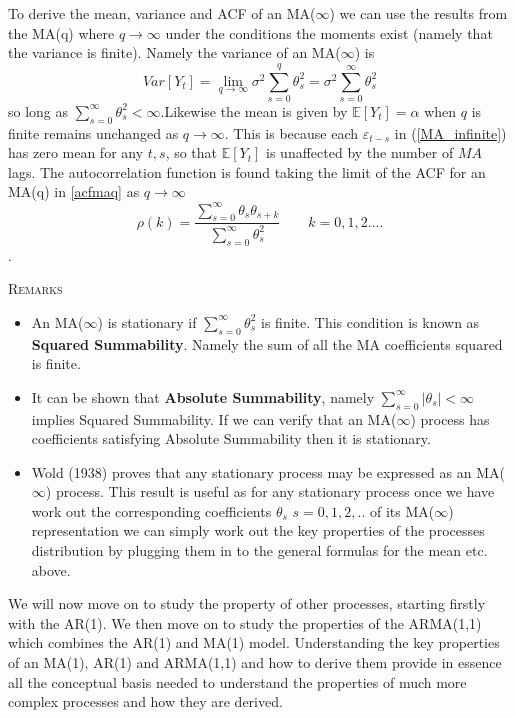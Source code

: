 \documentclass[openany]{tufte-book} %
\begin{document}
 To derive the mean, variance and ACF of an MA($\infty$) we can use the results from the MA(q) where $q\rightarrow \infty$ under the conditions the moments exist (namely that the variance is finite). Namely the variance of an MA($\infty$) is
\begin{equation*} Var[Y_t]=\underset{q\rightarrow \infty}{\lim}\sigma^2\sum_{s=0}^q \theta_s^2= \sigma^2\sum_{s=0}^\infty \theta_s^2\end{equation*}
so long as $\sum_{s=0}^\infty \theta_s^2<\infty$.Likewise the mean is given by
$\mathbb{E}\left[ Y_{t}\right] =\alpha $ when $q$ is finite remains unchanged as $q\rightarrow \infty .$ This is
because each $\varepsilon _{t-s}$ in (\ref{MA_infinite}) has zero mean for any $t,s$, so
that $\mathbb{E}[Y_{t}]$ is unaffected by the number of $MA$ lags.
 The autocorrelation function is found taking the limit of the ACF for an  MA(q)  in \ref{acfmaq} as $q \rightarrow \infty$
 \[ \rho(k) =  \frac{\sum_{s=0}^{\infty}\theta_{s}\theta_{s+k}}{\sum_{s=0}^\infty\theta_s^2} \qquad k=0,1,2....\].

\textsc{Remarks}
\begin{itemize}
\item An MA($\infty$) is stationary if $\sum_{s=0}^\infty\theta_s^2$ is finite. This condition is known as \textbf{Squared Summability}. Namely the sum of all the MA coefficients squared is finite.
\item It can be shown that \textbf{Absolute Summability}, namely $\sum_{s=0}^\infty|\theta_s|<\infty$ implies Squared Summability. If we can verify that an MA($\infty$) process has coefficients satisfying Absolute Summability then it is stationary.
    \item Wold (1938) proves that any stationary process may be expressed as an MA($\infty$) process. This result is useful as  for any stationary process once we have work out the corresponding coefficients  $\theta_s$ $s=0,1,2,..$ of its MA($\infty$) representation we can simply work out the key properties of the processes distribution by plugging them in to the general formulas for the mean etc. above.

        \end{itemize}
        We will now move on to study the property of other processes, starting firstly with the AR(1). We then move on to study the properties of the ARMA(1,1) which combines the AR(1) and MA(1) model. Understanding the key properties of an MA(1), AR(1) and ARMA(1,1) and how to derive them provide in essence all the  conceptual basis needed to understand the properties of much more complex processes and how they are  derived.
\end{document}
